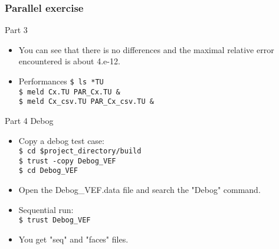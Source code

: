 \documentclass[10pt, hyperref={unicode=true,pdfusetitle, bookmarks=true,bookmarksnumbered=false,bookmarksopen=false, breaklinks=false,pdfborder={0 0 1},backref=true,colorlinks=true,linkcolor=darkblue,pageanchor, urlcolor=darkblue}]{beamer}
\begin{document}
\begin{frame}
\frametitle{Parallel exercise}

\begin{block}{Part 3}
\begin{itemize}
\item You can see that there is no differences and the maximal relative error encountered is about 4.e-12.
\item Performances
\texttt{\$ ls *TU }\\
\texttt{\$ meld Cx.TU PAR\_Cx.TU \& }\\
\texttt{\$ meld Cx\_csv.TU PAR\_Cx\_csv.TU \& }\\
\end{itemize}
\end{block}


\begin{block}{Part 4 Debog}
\begin{itemize}
\item Copy a debog test case:\\
\texttt{\$ cd \$project\_directory/build }\\
\texttt{\$ trust -copy Debog\_VEF }\\
\texttt{\$ cd Debog\_VEF }\\
\item Open the Debog\_VEF.data file and search the "Debog" command.
\item Sequential run:\\
\texttt{\$ trust Debog\_VEF }\\
\item You get "seq" and "faces" files.

\end{itemize}
\end{block}

\end{frame}
\end{document}
